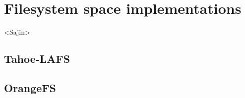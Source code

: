 \section{Filesystem space implementations}
\label{sec:filesystem}
<Sajin>

 \subsection{Tahoe-LAFS}
\hfill
 \subsection{OrangeFS}

